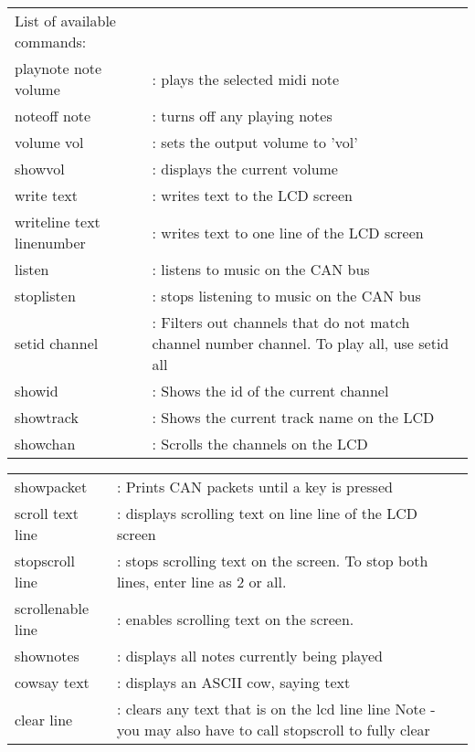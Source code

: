 \begin{table}[h]
\begin{tabular}{lp{8cm}}
List of available commands:\par\bigskip\noindent & \\
playnote note volume   & : plays the selected midi note\\
noteoff note           & : turns off any playing notes\\
volume vol           & : sets the output volume to 'vol'\\
showvol                & : displays the current volume\\
write text           & : writes text to the LCD screen\\
writeline text linenumber & : writes text to one line of the 
LCD screen\\ 
listen                 & : listens to music on the CAN bus\\
stoplisten             & : stops listening to music on the CAN bus\\
setid channel        & : Filters out channels that do not match 
channel number channel. To play all, use setid all\\
showid                 & : Shows the id of the current channel\\
showtrack              & : Shows the current track name on the LCD\\
showchan               & : Scrolls the channels on the LCD\\
\end{tabular}
\end{table}
\begin{table}[h]
\begin{tabular}{lp{10cm}}
showpacket             & : Prints CAN packets until a key is pressed\\
scroll text line & : displays scrolling text on line line of the 
LCD screen\\
stopscroll line      & : stops scrolling text on the screen. To stop both lines, 
enter line as 2 or all.\\
scrollenable line    & : enables scrolling text on the screen.\\
shownotes              & : displays all notes currently being played\\
cowsay text        & : displays an ASCII cow, saying text\\
clear line           & : clears any text that is on the lcd line line 
Note - you may also have to call stopscroll to fully clear\\
\end{tabular}
\end{table}

